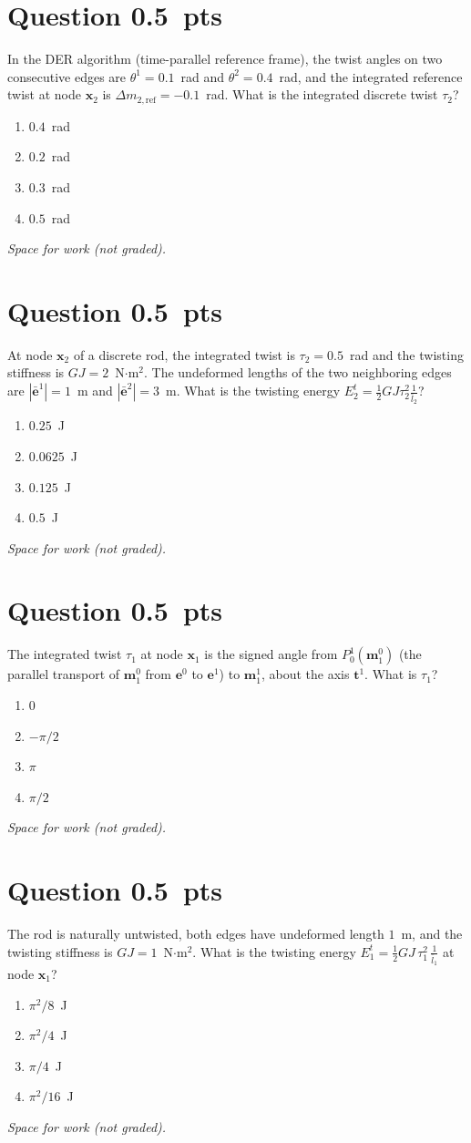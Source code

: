 \documentclass[letterpaper,11pt]{article}
\newcounter{qnum}
\newcommand{\qpts}{0.5}
\newcommand{\mcq}[5]{%
  \clearpage
  \stepcounter{qnum}%
  \section*{Question \theqnum \hfill \normalsize \qpts~pts}
  #1
  \begin{enumerate}[label=(\alph*)]
    \item #2
    \item #3
    \item #4
    \item #5
  \end{enumerate}
  \vspace{3mm}

  \textit{Space for work (not graded).}
}
\begin{document}
%
%
\mcq{In the DER algorithm (time-parallel reference frame), the twist angles on two consecutive edges are $\theta^1 = 0.1$~rad and $\theta^2 = 0.4$~rad, and the integrated reference twist at node $\mathbf{x}_2$ is $\Delta m_{2,\text{ref}} = -0.1$~rad. What is the integrated discrete twist $\tau_2$?}
  {$0.4$~rad}
  {$0.2$~rad}
  {$0.3$~rad}
  {$0.5$~rad}

%
%
\mcq{At node $\mathbf{x}_2$ of a discrete rod, the integrated twist is $\tau_2 = 0.5$~rad and the twisting stiffness is $GJ = 2$~N$\cdot$m$^2$. The undeformed lengths of the two neighboring edges are $|\bar{\mathbf{e}}^1| = 1$~m and $|\bar{\mathbf{e}}^2| = 3$~m. What is the twisting energy $E^t_2 = \frac{1}{2} GJ \tau_2^2 \frac{1}{\bar{l}_2}$?}
  {$0.25$~J}
  {$0.0625$~J}
  {$0.125$~J}
  {$0.5$~J}

%
%
%
%
\mcq{\twistsetup{}The integrated twist $\tau_1$ at node $\mathbf{x}_1$ is the signed angle from $P^1_0(\mathbf{m}^0_1)$ (the parallel transport of $\mathbf{m}^0_1$ from $\mathbf{e}^0$ to $\mathbf{e}^1$) to $\mathbf{m}^1_1$, about the axis $\mathbf{t}^1$. What is $\tau_1$?}
  {$0$}
  {$-\pi/2$}
  {$\pi$}
  {$\pi/2$}

%
%
\mcq{\twistsetup{}The rod is naturally untwisted, both edges have undeformed length $1$~m, and the twisting stiffness is $GJ = 1$~N$\cdot$m$^2$. What is the twisting energy $E^t_1 = \frac{1}{2} GJ \, \tau_1^2 \, \frac{1}{\bar{l}_1}$ at node $\mathbf{x}_1$?}
  {$\pi^2/8$~J}
  {$\pi^2/4$~J}
  {$\pi/4$~J}
  {$\pi^2/16$~J}
\end{document}
